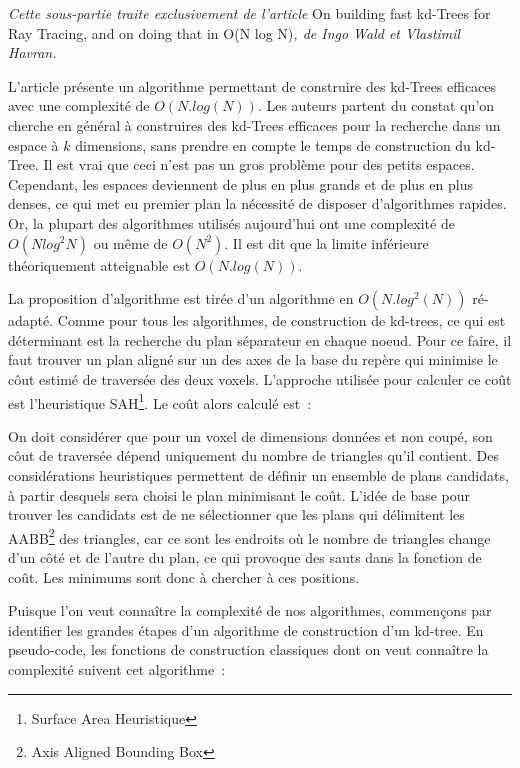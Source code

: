 \documentclass[a4paper]{article}
\begin{document}
\textit{Cette sous-partie traite exclusivement de l'article} On building fast kd-Trees for Ray Tracing, and on doing that in O(N log N)\textit{, de Ingo Wald et Vlastimil Havran.}

L'article présente un algorithme permettant de construire des kd-Trees efficaces avec une complexité de $O(N.log(N))$. Les auteurs partent du constat qu'on cherche en général à construires des kd-Trees efficaces pour la recherche dans un espace à $k$ dimensions, sans prendre en compte le temps de construction du kd-Tree. Il est vrai que ceci n'est pas un gros problème pour des petits espaces. Cependant, les espaces deviennent de plus en plus grands et de plus en plus denses, ce qui met eu premier plan la nécessité de disposer d'algorithmes rapides. Or, la plupart des algorithmes utilisés aujourd'hui ont une complexité de $O(Nlog^2N)$ ou même de $O(N^2)$. Il est dit que la limite inférieure théoriquement atteignable est $O(N.log(N))$.

La proposition d'algorithme est tirée d'un algorithme en $O(N.log^2(N))$ ré-adapté. Comme pour tous les algorithmes, de construction de kd-trees, ce qui est déterminant est la recherche du plan séparateur en chaque noeud. Pour ce faire, il faut trouver un plan aligné sur un des axes de la base du repère qui minimise le côut estimé de traversée des deux voxels. L'approche utilisée pour calculer ce coût est l'heuristique SAH\footnote{Surface Area Heuristique}. Le coût alors calculé est~:


On doit considérer que pour un voxel de dimensions données et non coupé, son côut de traversée dépend uniquement du nombre de triangles qu'il contient.
Des considérations heuristiques permettent de définir un ensemble de plans candidats, à partir desquels sera choisi le plan minimisant le coût. L'idée de base pour trouver les candidats est de ne sélectionner que les plans qui délimitent les AABB\footnote{Axis Aligned Bounding Box} des triangles, car ce sont les endroits où le nombre de triangles change d'un c\^oté et de l'autre du plan, ce qui provoque des sauts dans la fonction de co\^ut. Les minimums sont donc à chercher à ces positions.

Puisque l'on veut connaître la complexité de nos algorithmes, commençons par identifier les grandes étapes d'un algorithme de construction d'un kd-tree. En pseudo-code, les fonctions de construction classiques dont on veut connaître la complexité suivent cet algorithme~:
\begin{function}
\end{function}
\end{document}
